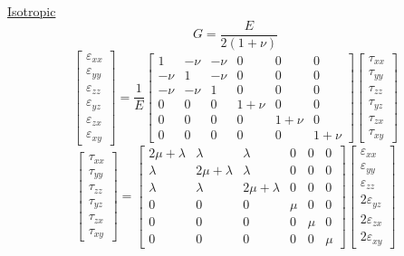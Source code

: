 \documentclass[twocolumn, 12pt]{article}    %
\begin{document}
\underline{Isotropic}\\
\begin{equation*}
    G = \frac{E}{2(1+\nu)}
\end{equation*}
\begin{equation*}
    \begin{bmatrix}
        \varepsilon_{xx} \\
        \varepsilon_{yy}\\
        \varepsilon_{zz}\\
        \varepsilon_{yz}\\
        \varepsilon_{zx}\\
        \varepsilon_{xy}
    \end{bmatrix}
    =\frac{1}{E}
    \begin{bmatrix}
        1 & -\nu & -\nu & 0 &0 &0\\
        -\nu &1 & -\nu &0 &0 &0\\
        -\nu &-\nu &1 &0 &0 &0\\
        0 & 0 & 0 & 1+\nu & 0 &0\\
        0 & 0 & 0 & 0 & 1+\nu & 0\\
        0 & 0 & 0 & 0 &0 & 1+\nu
    \end{bmatrix}
    \begin{bmatrix}
        \tau_{xx}\\
        \tau_{yy}\\
        \tau_{zz}\\
        \tau_{yz}\\
        \tau_{zx}\\
        \tau_{xy}
    \end{bmatrix}
\end{equation*}
\begin{equation*}
    \begin{bmatrix}
        \tau_{xx}\\
        \tau_{yy}\\
        \tau_{zz}\\
        \tau_{yz}\\
        \tau_{zx}\\
        \tau_{xy}
    \end{bmatrix} =
    \begin{bmatrix}
        2\mu+\lambda & \lambda & \lambda & 0 &0 &0\\
        \lambda &2\mu+\lambda & \lambda &0 &0 &0\\
        \lambda & \lambda &2\mu+\lambda &0 &0 &0\\
        0 & 0 & 0 & \mu & 0 &0\\
        0 & 0 & 0 & 0 & \mu & 0\\
        0 & 0 & 0 & 0 &0 & \mu
    \end{bmatrix}
    \begin{bmatrix}
        \varepsilon_{xx} \\
        \varepsilon_{yy}\\
        \varepsilon_{zz}\\
        2\varepsilon_{yz}\\
        2\varepsilon_{zx}\\
        2\varepsilon_{xy}
    \end{bmatrix}
\end{equation*}
\end{document}
